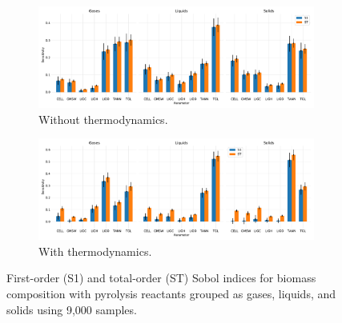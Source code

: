 \begin{figure}[H]
    \begin{subfigure}{\textwidth}
        \centering
        \includegraphics[width=\textwidth]{figures/sa-bar-n1000.pdf}
        \caption{Without thermodynamics.}
    \end{subfigure}
    \begin{subfigure}{\textwidth}
        \centering
        \includegraphics[width=\textwidth]{figures/sa-bar-n1000-energy.pdf}
        \caption{With thermodynamics.}
    \end{subfigure}
    \caption{First-order (S1) and total-order (ST) Sobol indices for biomass composition with pyrolysis reactants grouped as gases, liquids, and solids using 9,000 samples.}
    \label{fig:batch-sa3}
\end{figure}
